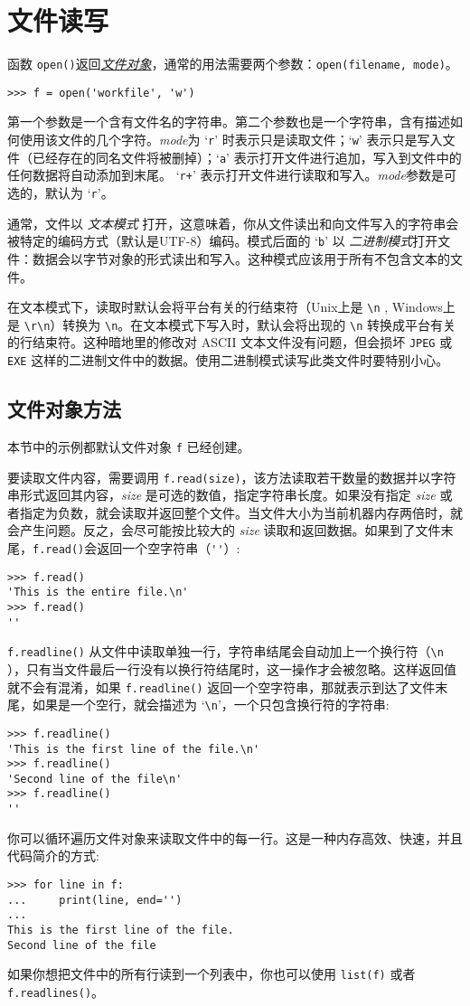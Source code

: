 \section{文件读写}
函数 \texttt{open()}返回\href{https://docs.python.org/3/glossary.html#term-file-object}{\textit{文件对象}}，通常的用法需要两个参数：\texttt{open(filename, mode)}。
\begin{lstlisting}
>>> f = open('workfile', 'w')
\end{lstlisting}
第一个参数是一个含有文件名的字符串。第二个参数也是一个字符串，含有描述如何使用该文件的几个字符。\textit{mode}为 ‘\verb|r|’ 时表示只是读取文件；‘\verb|w|’ 表示只是写入文件（已经存在的同名文件将被删掉）；‘\verb|a|’ 表示打开文件进行追加，写入到文件中的任何数据将自动添加到末尾。 ‘\verb|r+|’ 表示打开文件进行读取和写入。\textit{mode}参数是可选的，默认为 ‘\verb|r|’。

通常，文件以 \textit{文本模式} 打开，这意味着，你从文件读出和向文件写入的字符串会被特定的编码方式（默认是UTF-8）编码。模式后面的 ‘\verb|b|’ 以 \textit{二进制模式}打开文件：数据会以字节对象的形式读出和写入。这种模式应该用于所有不包含文本的文件。

在文本模式下，读取时默认会将平台有关的行结束符（Unix上是 \verb|\n| , Windows上是 \verb|\r\n|）转换为 \verb|\n|。在文本模式下写入时，默认会将出现的 \verb|\n| 转换成平台有关的行结束符。这种暗地里的修改对 ASCII 文本文件没有问题，但会损坏 \verb|JPEG| 或 \verb|EXE| 这样的二进制文件中的数据。使用二进制模式读写此类文件时要特别小心。
\subsection{文件对象方法}
本节中的示例都默认文件对象 \texttt{f} 已经创建。

要读取文件内容，需要调用 \texttt{f.read(size)}，该方法读取若干数量的数据并以字符串形式返回其内容，\textit{size} 是可选的数值，指定字符串长度。如果没有指定 \textit{size} 或者指定为负数，就会读取并返回整个文件。当文件大小为当前机器内存两倍时，就会产生问题。反之，会尽可能按比较大的 \textit{size} 读取和返回数据。如果到了文件末尾，\texttt{f.read()}会返回一个空字符串（\verb|''|）:
\begin{lstlisting}
>>> f.read()
'This is the entire file.\n'
>>> f.read()
''
\end{lstlisting}

\texttt{f.readline()} 从文件中读取单独一行，字符串结尾会自动加上一个换行符（\verb|\n| ），只有当文件最后一行没有以换行符结尾时，这一操作才会被忽略。这样返回值就不会有混淆，如果 \texttt{f.readline()} 返回一个空字符串，那就表示到达了文件末尾，如果是一个空行，就会描述为 ‘\verb|\n|’，一个只包含换行符的字符串:
\begin{lstlisting}
>>> f.readline()
'This is the first line of the file.\n'
>>> f.readline()
'Second line of the file\n'
>>> f.readline()
''
\end{lstlisting}
你可以循环遍历文件对象来读取文件中的每一行。这是一种内存高效、快速，并且代码简介的方式:
\begin{lstlisting}
>>> for line in f:
...     print(line, end='')
...
This is the first line of the file.
Second line of the file
\end{lstlisting}
如果你想把文件中的所有行读到一个列表中，你也可以使用 \texttt{list(f)} 或者 \texttt{f.readlines()}。

